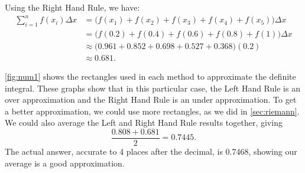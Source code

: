 \begin{example}
Using the Right Hand Rule, we have:
\begin{align*}
	\sum_{i=1}^n f(x_i)\Delta x
	&= \bigl(f(x_1)+f(x_2) + f(x_3) + f(x_4) + f(x_5)\bigr)\Delta x \\
	&= \bigl(f(0.2) + f(0.4) + f(0.6) + f(0.8)+f(1)\bigr)\Delta x \\
	&\approx \bigl(0.961 +0.852 + 0.698 + 0.527 + 0.368\bigr)(0.2)\\
	&\approx 0.681.
\end{align*}

\autoref{fig:num1} shows the rectangles used in each method to approximate the definite integral. These graphs show that in this particular case, the Left Hand Rule is an over approximation and the Right Hand Rule is an under approximation. To get a better approximation, we could use more rectangles, as we did in \autoref{sec:riemann}. We could also average the Left and Right Hand Rule results together, giving
\[\frac{0.808 + 0.681}{2} = 0.7445.\]
The actual answer, accurate to 4 places after the decimal, is 0.7468, showing our average is a good approximation.
\end{example}


